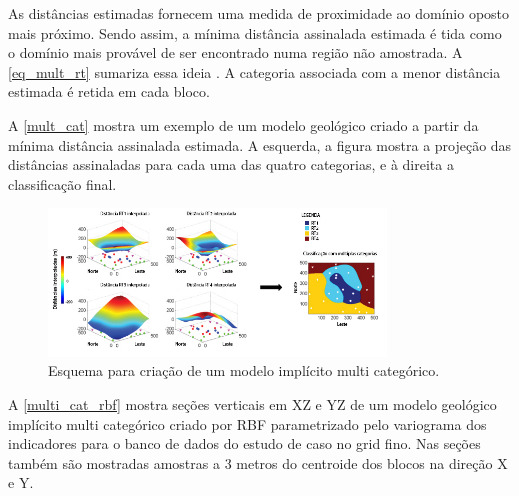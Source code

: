As distâncias estimadas fornecem uma medida de proximidade ao domínio oposto mais próximo. Sendo assim, a mínima distância assinalada estimada é tida como o domínio mais provável de ser encontrado numa região não amostrada. A \autoref{eq_mult_rt} sumariza essa ideia \cite{silvaenhancedgeomodeling}. A categoria associada com a menor distância estimada é retida em cada bloco.

A \autoref{mult_cat} mostra um exemplo de um modelo geológico criado a partir da mínima distância assinalada estimada. A esquerda, a figura mostra a projeção das distâncias assinaladas para cada uma das quatro categorias, e à direita a classificação final.

\begin{figure}[!ht]
    \caption{\label{mult_cat}Esquema para criação de um modelo implícito multi categórico.}
	\begin{center}
		\includegraphics[width=0.8\textwidth]{capitulo_2/mult_cat_legenda.jpg}
	\end{center}
\end{figure}

A \autoref{multi_cat_rbf} mostra seções verticais em XZ e YZ de um modelo geológico implícito multi categórico criado por RBF parametrizado pelo variograma dos indicadores para o banco de dados do estudo de caso no grid fino. Nas seções também são mostradas amostras a 3 metros do centroide dos blocos na direção X e Y.

